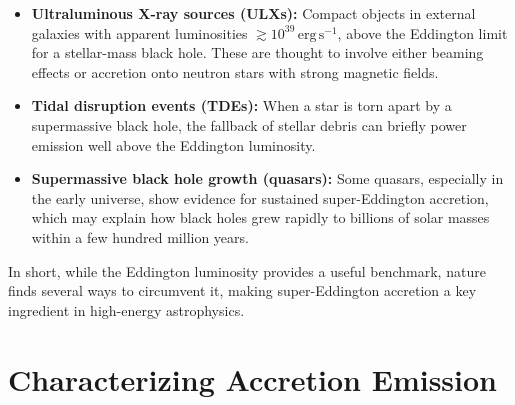 \begin{itemize}
    \item \textbf{Ultraluminous X-ray sources (ULXs):} Compact objects in external galaxies with apparent luminosities $\gtrsim 10^{39}\,\mathrm{erg\,s^{-1}}$, above the Eddington limit for a stellar-mass black hole. These are thought to involve either beaming effects or accretion onto neutron stars with strong magnetic fields.
    \item \textbf{Tidal disruption events (TDEs):} When a star is torn apart by a supermassive black hole, the fallback of stellar debris can briefly power emission well above the Eddington luminosity.
    \item \textbf{Supermassive black hole growth (quasars):} Some quasars, especially in the early universe, show evidence for sustained super-Eddington accretion, which may explain how black holes grew rapidly to billions of solar masses within a few hundred million years.
\end{itemize}
\vspace{0.25cm}
In short, while the Eddington luminosity provides a useful benchmark, nature finds several ways to circumvent it, making super-Eddington accretion a key ingredient in high-energy astrophysics.

\section{Characterizing Accretion Emission}

